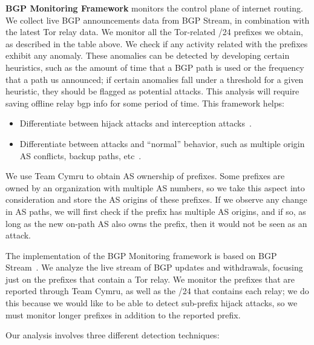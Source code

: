 {\bf BGP Monitoring Framework} monitors the control plane of internet routing. We collect live BGP announcements data from BGP Stream, in combination with the latest Tor relay data. We monitor all the Tor-related /24 prefixes we obtain, as described in the table above. We check if any activity related with the prefixes exhibit any anomaly. These anomalies can be detected by developing certain heuristics, such as the amount of time that a BGP path is used or the frequency that a path us announced; if certain anomalies fall under a threshold for a given heuristic, they should be flagged as potential attacks. This analysis will require saving offline relay bgp info for some period of time.  This framework helps:

\begin{itemize}
\item Differentiate between hijack attacks and interception attacks~\cite{ballani2007study}.
\item Differentiate between attacks and ``normal'' behavior, such as multiple origin AS conflicts, backup paths, etc~\cite{zhao2001analysis}.
\end{itemize}

We use Team Cymru to obtain AS ownership of prefixes. Some prefixes are owned by an organization with multiple AS numbers, so we take this aspect into consideration and store the AS origins of these prefixes. If we observe any change in AS paths, we will first check if the prefix has multiple AS origins, and if so, as long as the new on-path AS also owns the prefix, then it would not be seen as an attack. 

The implementation of the BGP Monitoring framework is based on BGP Stream~\cite{bgpstream}.  We analyze the live stream of BGP updates and withdrawals, focusing just on the prefixes that contain a Tor relay.  We monitor the prefixes that are reported through Team Cymru, as well as the /24 that contains each relay; we do this because we would like to be able to detect sub-prefix hijack attacks, so we must monitor longer prefixes in addition to the reported prefix.  

Our analysis involves three different detection techniques:


